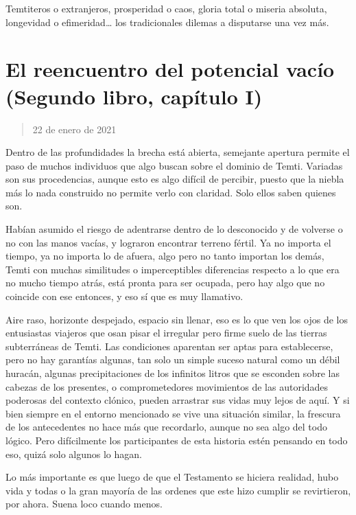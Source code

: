 \documentclass[
  spanish,
]{book}
\begin{document}
Temtiteros o extranjeros, prosperidad o caos, gloria total o miseria absoluta, longevidad o efimeridad\ldots{} los tradicionales dilemas a disputarse una vez más.

\hypertarget{el-reencuentro-del-potencial-vacuxedo-segundo-libro-capuxedtulo-i}{%
\section{El reencuentro del potencial vacío (Segundo libro, capítulo I)}\label{el-reencuentro-del-potencial-vacuxedo-segundo-libro-capuxedtulo-i}}

\begin{quote}
22 de enero de 2021
\end{quote}

Dentro de las profundidades la brecha está abierta, semejante apertura permite el paso de muchos individuos que algo buscan sobre el dominio de Temti. Variadas son sus procedencias, aunque esto es algo difícil de percibir, puesto que la niebla más lo nada construido no permite verlo con claridad. Solo ellos saben quienes son.

Habían asumido el riesgo de adentrarse dentro de lo desconocido y de volverse o no con las manos vacías, y lograron encontrar terreno fértil. Ya no importa el tiempo, ya no importa lo de afuera, algo pero no tanto importan los demás, Temti con muchas similitudes o imperceptibles diferencias respecto a lo que era no mucho tiempo atrás, está pronta para ser ocupada, pero hay algo que no coincide con ese entonces, y eso sí que es muy llamativo.

Aire raso, horizonte despejado, espacio sin llenar, eso es lo que ven los ojos de los entusiastas viajeros que osan pisar el irregular pero firme suelo de las tierras subterráneas de Temti. Las condiciones aparentan ser aptas para establecerse, pero no hay garantías algunas, tan solo un simple suceso natural como un débil huracán, algunas precipitaciones de los infinitos litros que se esconden sobre las cabezas de los presentes, o comprometedores movimientos de las autoridades poderosas del contexto clónico, pueden arrastrar sus vidas muy lejos de aquí. Y si bien siempre en el entorno mencionado se vive una situación similar, la frescura de los antecedentes no hace más que recordarlo, aunque no sea algo del todo lógico. Pero difícilmente los participantes de esta historia estén pensando en todo eso, quizá solo algunos lo hagan.

Lo más importante es que luego de que el Testamento se hiciera realidad, hubo vida y todas o la gran mayoría de las ordenes que este hizo cumplir se revirtieron, por ahora. Suena loco cuando menos.
\end{document}
